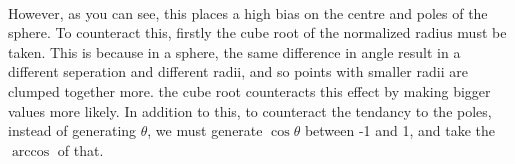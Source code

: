 \documentclass[11pt]{article}
\begin{document}
    \begin{center}
    \end{center}
    { \hspace*{\fill} \\}
    
    However, as you can see, this places a high bias on the centre and poles
of the sphere. To counteract this, firstly the cube root of the
normalized radius must be taken. This is because in a sphere, the same
difference in angle result in a different seperation and different
radii, and so points with smaller radii are clumped together more. the
cube root counteracts this effect by making bigger values more likely.
In addition to this, to counteract the tendancy to the poles, instead of
generating \(\theta\), we must generate \(\cos\theta\) between -1 and 1,
and take the \(\arccos\) of that.
\end{document}
